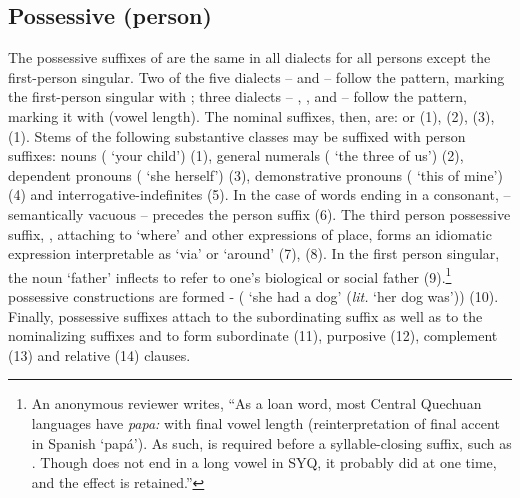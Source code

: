 {\subsection{Possessive (person)}\label{ssec:alloP}
The possessive suffixes of \SYQ{} are the same in all dialects for all persons except the first-person singular. Two of the five dialects -- \AMV{} and \LT{} -- follow the \QII{} pattern, marking the first-person singular with ; three dialects -- \ACH{}, \CH{}, and \SP{} -- follow the \QI{} pattern, marking it with \phono{-:} (vowel length). The \SYQ{} nominal suffixes, then, are:  or \phono{-:} (1),  (2),  (3),  (1). Stems of the following substantive classes may be suffixed with person suffixes: nouns ( `your child') (1), general numerals ( `the three of us') (2), dependent pronouns ( `she herself') (3), demonstrative pronouns ( `this of mine') (4) and interrogative-indefinites (5). In the case of words ending in a consonant,  -- semantically vacuous -- precedes the person suffix (6). The third person possessive suffix, , attaching to  `where' and other expressions of place, forms an idiomatic expression interpretable as `via' or `around' (7), (8). In the first person singular, the noun  `father' inflects  to refer to one's biological or social father (9).\footnote{An anonymous reviewer writes, ``As a loan word, most Central Quechuan languages have \emph{papa:} with final vowel length (reinterpretation of final accent in Spanish `pap\'a'). As such,  is required before a syllable-closing suffix, such as . Though  does not end in a long vowel in SYQ, it probably did at one time, and the effect is retained.''} \SYQ{} possessive constructions are formed -  ( `she had a dog' (\emph{lit.} `her dog was')) (10). Finally, possessive suffixes attach to the subordinating suffix  as well as to the nominalizing suffixes  and  to form subordinate (11), purposive (12), complement (13) and relative (14) clauses.

}
